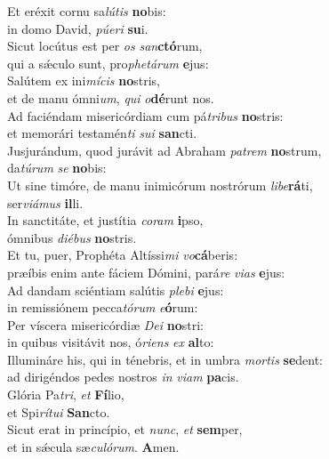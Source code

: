 \evenverse Et eréxit cornu sa\textit{lú}\textit{tis} \textbf{no}bis:~\*\\
\evenverse in domo David, \textit{pú}\textit{e}\textit{ri} \textbf{su}i.\\
\oddverse Sicut locútus est per \textit{os} \textit{san}\textbf{ctó}rum,~\*\\
\oddverse qui a sǽculo sunt, pro\textit{phe}\textit{tá}\textit{rum} \textbf{e}jus:\\
\evenverse Salútem ex ini\textit{mí}\textit{cis} \textbf{no}stris,~\*\\
\evenverse et de manu ómni\textit{um}, \textit{qui} \textit{o}\textbf{dé}runt nos.\\
\oddverse Ad faciéndam misericórdiam cum pá\textit{tri}\textit{bus} \textbf{no}stris:~\*\\
\oddverse et memorári testamén\textit{ti} \textit{su}\textit{i} \textbf{san}cti.\\
\evenverse Jusjurándum, quod jurávit ad Abraham \textit{pa}\textit{trem} \textbf{no}strum,~\*\\
\evenverse da\textit{tú}\textit{rum} \textit{se} \textbf{no}bis:\\
\oddverse Ut sine timóre, de manu inimicórum nostrórum \textit{li}\textit{be}\textbf{rá}ti,~\*\\
\oddverse ser\textit{vi}\textit{á}\textit{mus} \textbf{il}li.\\
\evenverse In sanctitáte, et justítia \textit{co}\textit{ram} \textbf{i}pso,~\*\\
\evenverse ómnibus \textit{di}\textit{é}\textit{bus} \textbf{no}stris.\\
\oddverse Et tu, puer, Prophéta Altíssi\textit{mi} \textit{vo}\textbf{cá}beris:~\*\\
\oddverse præíbis enim ante fáciem Dómini, pará\textit{re} \textit{vi}\textit{as} \textbf{e}jus:\\
\evenverse Ad dandam sciéntiam salútis \textit{ple}\textit{bi} \textbf{e}jus:~\*\\
\evenverse in remissiónem pecca\textit{tó}\textit{rum} \textit{e}\textbf{ó}rum:\\
\oddverse Per víscera misericórdiæ \textit{De}\textit{i} \textbf{no}stri:~\*\\
\oddverse in quibus visitávit nos, ó\textit{ri}\textit{ens} \textit{ex} \textbf{al}to:\\
\evenverse Illumináre his, qui in ténebris, et in umbra \textit{mor}\textit{tis} \textbf{se}dent:~\*\\
\evenverse ad dirigéndos pedes nostros \textit{in} \textit{vi}\textit{am} \textbf{pa}cis.\\
\oddverse Glória Pa\textit{tri}, \textit{et} \textbf{Fí}lio,~\*\\
\oddverse et Spi\textit{rí}\textit{tu}\textit{i} \textbf{San}cto.\\
\evenverse Sicut erat in princípio, et \textit{nunc}, \textit{et} \textbf{sem}per,~\*\\
\evenverse et in sǽcula sæ\textit{cu}\textit{ló}\textit{rum}. \textbf{A}men.\\
